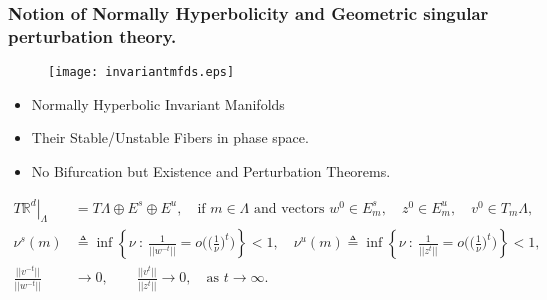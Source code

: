 \documentclass{beamer}
\def\red{\color{red}}
\def\blue{\color{blue}}
\begin{document}
\begin{frame}
\frametitle{Notion of Normally Hyperbolicity and Geometric singular perturbation theory.}
 \begin{minipage}{0.55\linewidth}
  \begin{figure}
    \centering
    \texttt{[image: invariantmfds.eps]}
  \end{figure}
 \end{minipage}
 \begin{minipage}{0.4\linewidth}
 \vfill
 \begin{itemize}
  \item Normally Hyperbolic Invariant Manifolds 
  \item Their Stable/Unstable Fibers in phase space.
  \item {\red No Bifurcation} but Existence and Perturbation Theorems.
 \end{itemize}
 \vfill
 \end{minipage}
 \pause
 {\scriptsize
 \begin{align*}
  \left.T\mathbb{R}^d\right|_{\Lambda} &= T\Lambda\oplus E^s \oplus E^u, \quad\text{if $m \in \Lambda$ and vectors } w^0\in E^s_m, \quad z^0\in E^u_m, \quad v^0\in T_m\Lambda,\\
  \nu^s(m)&\triangleq \inf\left\{\nu\: :\: \frac{1}{||w^{-t}||} = o\Big(\Big(\frac{1}{\nu}\Big)^t\Big) \right\}<1, \quad\nu^u(m)\triangleq \inf\left\{\nu\::\: \frac{1}{||z^{t}||} = o\Big(\Big(\frac{1}{\nu}\Big)^t\Big)\right\}<1,\\
  \frac{||v^{-t}||}{||w^{-t}||} &\rightarrow 0, \quad \quad \frac{||v^{t}||}{||z^{t}||} \rightarrow 0, \quad \text{as $t \rightarrow \infty$.}
 \end{align*}
 }
\end{frame}
\end{document}

